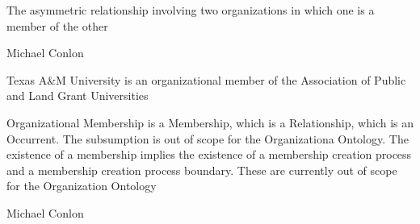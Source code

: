 \documentclass[letterpaper,10pt,english]{sphinxmanual}
\begin{document}
\begin{sphinxShadowBox}

\sphinxAtStartPar
{\hyperref[\detokenize{doc-BFO_0000003::doc}]{}}
\end{sphinxShadowBox}

\begin{sphinxShadowBox}

\sphinxAtStartPar
The asymmetric relationship involving two organizations in which one is a member of the other
\end{sphinxShadowBox}

\begin{sphinxShadowBox}

\sphinxAtStartPar
Michael Conlon 
\end{sphinxShadowBox}

\begin{sphinxShadowBox}

\sphinxAtStartPar
Texas A\&M University is an organizational member of the Association of Public and Land Grant Universities
\end{sphinxShadowBox}

\begin{sphinxShadowBox}

\sphinxAtStartPar
Organizational Membership is a Membership, which is a Relationship, which is an Occurrent.  The subsumption is out of scope for the Organizationa Ontology. The existence of a membership implies the existence of a membership creation process and a membership creation process boundary.  These are currently out of scope for the Organization Ontology
\end{sphinxShadowBox}

\begin{sphinxShadowBox}

\sphinxAtStartPar
Michael Conlon 
\end{sphinxShadowBox}
\begin{quote}

\ignorespaces \end{quote}
\end{document}
